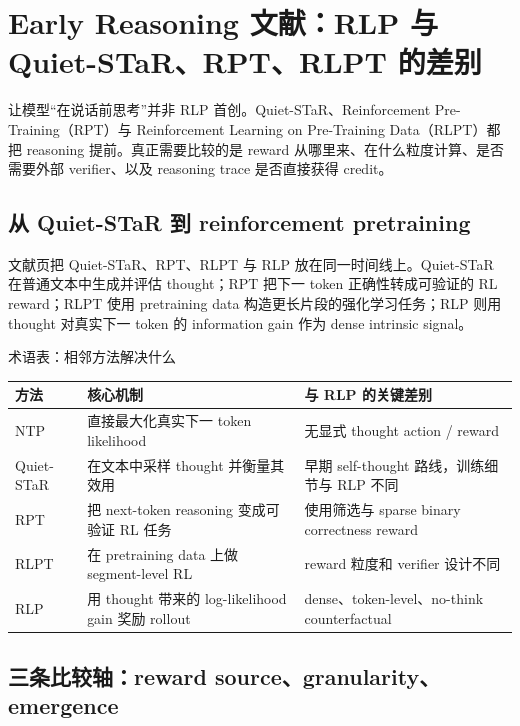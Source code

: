 \section{Early Reasoning 文献：RLP 与 Quiet-STaR、RPT、RLPT 的差别}

让模型“在说话前思考”并非 RLP 首创。Quiet-STaR、Reinforcement Pre-Training（RPT）与 Reinforcement Learning on Pre-Training Data（RLPT）都把 reasoning 提前。真正需要比较的是 reward 从哪里来、在什么粒度计算、是否需要外部 verifier、以及 reasoning trace 是否直接获得 credit。

\subsection{从 Quiet-STaR 到 reinforcement pretraining}

文献页把 Quiet-STaR、RPT、RLPT 与 RLP 放在同一时间线上。Quiet-STaR 在普通文本中生成并评估 thought；RPT 把下一 token 正确性转成可验证的 RL reward；RLPT 使用 pretraining data 构造更长片段的强化学习任务；RLP 则用 thought 对真实下一 token 的 information gain 作为 dense intrinsic signal。


\begin{knowledgebox}{术语表：相邻方法解决什么}
\begin{tabularx}{\textwidth}{L{0.18\textwidth}X X}
\toprule
方法 & 核心机制 & 与 RLP 的关键差别 \\
\midrule
NTP & 直接最大化真实下一 token likelihood & 无显式 thought action / reward \\
Quiet-STaR & 在文本中采样 thought 并衡量其效用 & 早期 self-thought 路线，训练细节与 RLP 不同 \\
RPT & 把 next-token reasoning 变成可验证 RL 任务 & 使用筛选与 sparse binary correctness reward \\
RLPT & 在 pretraining data 上做 segment-level RL & reward 粒度和 verifier 设计不同 \\
RLP & 用 thought 带来的 log-likelihood gain 奖励 rollout & dense、token-level、no-think counterfactual \\
\bottomrule
\end{tabularx}
\end{knowledgebox}

\subsection{三条比较轴：reward source、granularity、emergence}

